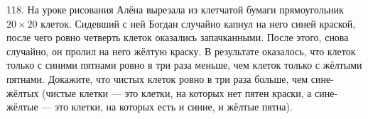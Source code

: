 118.  На уроке рисования Алёна вырезала из клетчатой бумаги прямоугольник $20\times20$ клеток. Сидевший с ней Богдан случайно капнул на него синей краской, после чего ровно четверть клеток оказались запачканными. После этого, снова случайно, он пролил на него жёлтую краску. В результате оказалось, что клеток только с синими пятнами ровно в три раза меньше, чем клеток только с жёлтыми пятнами. Докажите, что чистых клеток ровно в три раза больше, чем сине-жёлтых (чистые клетки --- это клетки, на которых нет пятен краски, а сине-жёлтые --- это клетки, на которых есть и синие, и жёлтые пятна).\\
